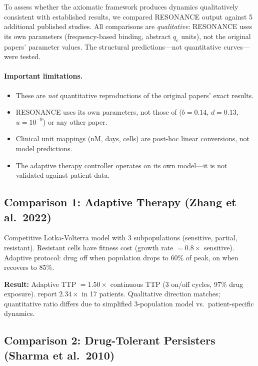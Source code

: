 \documentclass[11pt,a4paper]{article}
\begin{document}
To assess whether the axiomatic framework produces dynamics
qualitatively consistent with established results, we compared
RESONANCE output against 5 additional published studies.
All comparisons are \emph{qualitative}: RESONANCE uses its own
parameters (frequency-based binding, abstract $q_e$ units),
not the original papers' parameter values. The structural
predictions---not quantitative curves---were tested.

\paragraph{Important limitations.}
\begin{itemize}
  \item These are \emph{not} quantitative reproductions of the
        original papers' exact results.
  \item RESONANCE uses its own parameters, not those of
        \citet{bozic2013evolutionary} ($b{=}0.14$, $d{=}0.13$,
        $u{=}10^{-9}$) or any other paper.
  \item Clinical unit mappings (nM, days, cells) are post-hoc
        linear conversions, not model predictions.
  \item The adaptive therapy controller operates on its own
        model---it is not validated against patient data.
\end{itemize}

\subsection{Comparison 1: Adaptive Therapy (Zhang et al.\ 2022)}

Competitive Lotka-Volterra model with 3 subpopulations (sensitive,
partial, resistant). Resistant cells have fitness cost
(growth rate $= 0.8\times$ sensitive).
Adaptive protocol: drug off when population drops to 60\% of peak,
on when recovers to 85\%.

\textbf{Result:} Adaptive TTP $= 1.50\times$ continuous TTP
(3 on/off cycles, 97\% drug exposure).
\citet{zhang2022evolution} report $2.34\times$ in 17 patients.
Qualitative direction matches; quantitative ratio differs
due to simplified 3-population model vs.\ patient-specific dynamics.

\subsection{Comparison 2: Drug-Tolerant Persisters (Sharma et al.\ 2010)}
\end{document}
